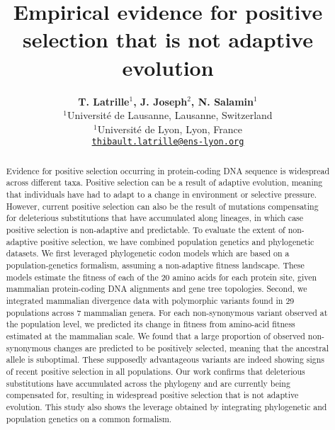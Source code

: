 \documentclass{article}
\title{Empirical evidence for positive selection that is not adaptive evolution}
\author{
    \large
    \textbf{T. {Latrille}$^{1}$, J. {Joseph}$^{2}$, N. {Salamin}$^{1}$}\\
    \normalsize
    $^{1}$Université de Lausanne, Lausanne, Switzerland\\
    $^{1}$Université de Lyon, Lyon, France \\
    \texttt{\href{mailto:thibault.latrille@ens-lyon.org}{thibault.latrille@ens-lyon.org}} \\
}
\begin{document}
    \maketitle

    \begin{abstract}
        Evidence for positive selection occurring in protein-coding DNA sequence is widespread across different taxa.
        Positive selection can be a result of adaptive evolution, meaning that individuals have had to adapt to a change in environment or selective pressure.
        However, current positive selection can also be the result of mutations compensating for deleterious substitutions that have accumulated along lineages, in which case positive selection is non-adaptive and predictable.
        To evaluate the extent of non-adaptive positive selection, we have combined population genetics and phylogenetic datasets.
        We first leveraged phylogenetic codon models which are based on a population-genetics formalism, assuming a non-adaptive fitness landscape.
        These models estimate the fitness of each of the 20 amino acids for each protein site, given mammalian protein-coding DNA alignments and gene tree topologies.
        Second, we integrated mammalian divergence data with polymorphic variants found in 29 populations across 7 mammalian genera.
        For each non-synonymous variant observed at the population level, we predicted its change in fitness from amino-acid fitness estimated at the mammalian scale.
        We found that a large proportion of observed non-synonymous changes are predicted to be positively selected, meaning that the ancestral allele is suboptimal.
        These supposedly advantageous variants are indeed showing signs of recent positive selection in all populations.
        Our work confirms that deleterious substitutions have accumulated across the phylogeny and are currently being compensated for, resulting in widespread positive selection that is not adaptive evolution.
        This study also shows the leverage obtained by integrating phylogenetic and population genetics on a common formalism.
    \end{abstract}

\end{document}

